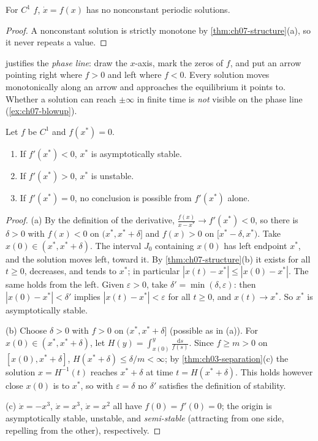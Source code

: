 \begin{corollary}\label{cor:ch07-no-periodic}
For $C^1$ $f$, $\dot x = f(x)$ has no nonconstant periodic solutions.
\end{corollary}
\begin{proof}
A nonconstant solution is strictly monotone by \cref{thm:ch07-structure}(a), so
it never repeats a value.
\end{proof}

 justifies the \emph{phase line}: draw the $x$-axis,
mark the zeros of $f$, and put an arrow pointing right where $f>0$ and left
where $f<0$. Every solution moves monotonically along an arrow and approaches
the equilibrium it points to. Whether a solution can reach $\pm\infty$ in
finite time is \emph{not} visible on the phase line
(\cref{ex:ch07-blowup}).

\begin{theorem}\label{thm:ch07-linearization}
Let $f$ be $C^1$ and $f(x^*) = 0$.
\begin{enumerate}[label=(\alph*)]
  \item If $f'(x^*)<0$, $x^*$ is asymptotically stable.
  \item If $f'(x^*)>0$, $x^*$ is unstable.
  \item If $f'(x^*) = 0$, no conclusion is possible from $f'(x^*)$ alone.
\end{enumerate}
\end{theorem}

\begin{proof}
(a) By the definition of the derivative,
$\frac{f(x)}{x - x^*}\to f'(x^*)<0$, so there is $\delta>0$ with $f(x)<0$ on
$(x^*, x^*+\delta]$ and $f(x)>0$ on $[x^* - \delta, x^*)$. Take
$x(0)\in(x^*, x^*+\delta)$. The interval $J_0$ containing $x(0)$ has left
endpoint $x^*$, and the solution moves left, toward it. By
\cref{thm:ch07-structure}(b) it exists for all $t\ge0$, decreases, and tends
to $x^*$; in particular $|x(t) - x^*|\le|x(0) - x^*|$. The same holds from the
left. Given $\varepsilon>0$, take $\delta' = \min(\delta,\varepsilon)$: then
$|x(0) - x^*|<\delta'$ implies $|x(t) - x^*|<\varepsilon$ for all $t\ge0$, and
$x(t)\to x^*$. So $x^*$ is asymptotically stable.

(b) Choose $\delta>0$ with $f>0$ on $(x^*,x^*+\delta]$ (possible as in (a)).
For $x(0)\in(x^*,x^*+\delta)$, let $H(y) = \int_{x(0)}^{y}\frac{\mathrm{d}s}{f(s)}$.
Since $f\ge m>0$ on $[x(0),x^*+\delta]$, $H(x^*+\delta)\le\delta/m<\infty$; by
\cref{thm:ch03-separation}(c) the solution $x = H^{-1}(t)$ reaches $x^*+\delta$
at time $t = H(x^*+\delta)$. This holds however close $x(0)$ is to $x^*$, so
with $\varepsilon = \delta$ no $\delta'$ satisfies the definition of stability.

(c) $\dot x = -x^3$, $\dot x = x^3$, $\dot x = x^2$ all have $f(0) = f'(0) = 0$;
the origin is asymptotically stable, unstable, and \emph{semi-stable}
(attracting from one side, repelling from the other), respectively.
\end{proof}

